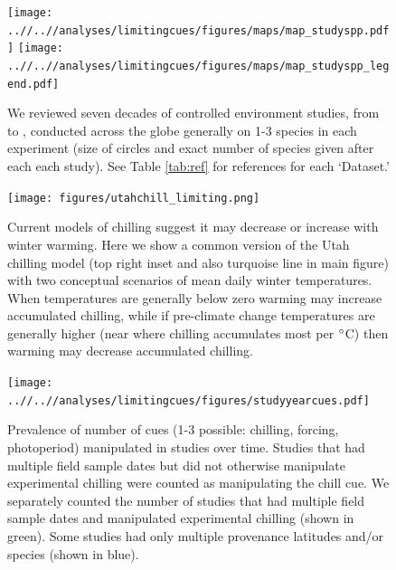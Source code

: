 \documentclass[11pt]{article}
\begin{document}
\begin{figure}[t!]
\centering
\texttt{[image: ..//..//analyses/limitingcues/figures/maps/map\_studyspp.pdf]}
\texttt{[image: ..//..//analyses/limitingcues/figures/maps/map\_studyspp\_legend.pdf]}
\caption{We reviewed seven decades of controlled environment studies, from \citet{Lamb:1948aa} to \citet{zohner2016}, conducted across the globe generally on 1-3 species in each experiment (size of circles and exact number of species given after each each study). See Table \ref{tab:ref} for references for each `Dataset.'}
  \label{fig:datamap} %
\end{figure}


\begin{figure}[t!]
\centering
\texttt{[image: figures/utahchill\_limiting.png]}
\caption{Current models of chilling suggest it may decrease or increase with winter warming. Here we show a common version of the Utah chilling model (top right inset and also turquoise line in main figure) with two conceptual scenarios of mean daily winter temperatures. When temperatures are generally below zero warming may increase accumulated chilling, while if pre-climate change temperatures are generally higher (near where chilling accumulates most per $\degree$C) then warming may decrease accumulated chilling.}
  \label{fig:chilling}
\end{figure}

\clearpage

\begin{figure}[t!]
\centering
\texttt{[image: ..//..//analyses/limitingcues/figures/studyyearcues.pdf]}
\caption{Prevalence of number of cues (1-3 possible: chilling, forcing, photoperiod) manipulated in studies over time. Studies that had multiple field sample dates but did not otherwise manipulate experimental chilling were counted as manipulating the chill cue. We separately counted the number of studies that had multiple field sample dates and manipulated experimental chilling (shown in green). Some studies had only multiple provenance latitudes and/or species (shown in blue). }
  \label{fig:ts}
\end{figure}
\end{document}
